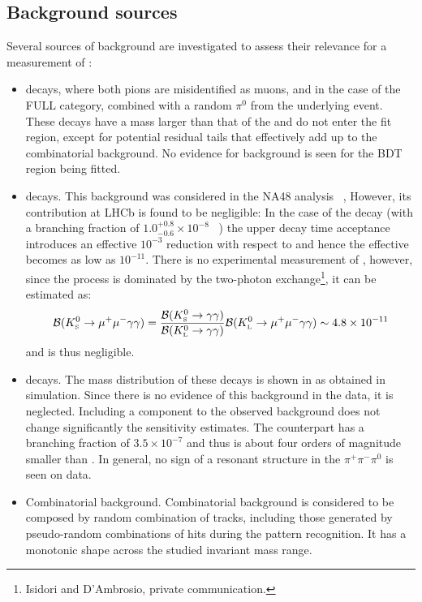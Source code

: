 
\subsection{Background sources}
\label{subsec:background}

Several sources of background are investigated to assess their relevance for a measurement of \BRof\Kspizmm:
\begin{itemize}
\item \Kspipi decays, where both pions are misidentified as muons, and in the case of the FULL category, combined with a random $\pi^0$ from the underlying event.
These decays have a mass larger than that of the \KS and do not enter the fit region, except for potential residual tails that effectively add up to the combinatorial background. %
No evidence for \Kspipi background is seen for the BDT region being fitted. 
\item \KTmTg decays. This background was considered in the NA48 analysis ~\cite{NA48}, 
However, its contribution at LHCb is found to be negligible: In the case of the \KL decay (with a branching fraction of $1.0^{+0.8}_{-0.6}\times10^{-8}$ ~\cite{PDG}) the upper decay time acceptance introduces 
an effective $10^{-3}$ reduction with respect to \KS and hence
the effective \BRof\KLTmTg becomes as low as $10^{-11}$. There is no experimental measurement of \BRof\KSTmTg, however, since
the process is dominated by the two-photon exchange\footnote{Isidori and D'Ambrosio, private communication.}, it can be estimated as:
\begin{equation}
{\cal B}(K^0_{\mathrm{\scriptscriptstyle S}}\to\mu^+\mu^-\gamma\gamma) = \frac{{\cal B}(K^0_{\mathrm{\scriptscriptstyle S}}\to\gamma\gamma)}{{\cal B}(K^0_{\mathrm{\scriptscriptstyle L}}\to\gamma\gamma)}{\cal B}(K^0_{\mathrm{\scriptscriptstyle L}}\to\mu^+\mu^-\gamma\gamma) \sim 4.8\times10^{-11}
\end{equation} 
\noindent and is thus negligible.
\item \KLTpi decays. The mass distribution of these decays is shown in  as obtained in simulation. Since there is no evidence of this background in the 
data, it is neglected. Including a \KLTpi component to the observed background does not change significantly the sensitivity estimates. The \KS counterpart has a branching fraction of $3.5\times10^{-7}$ and thus
is about four orders of magnitude smaller than \KLTpi. In general, no sign of a resonant structure in the $\pi^+\pi^-\pi^0$ is seen on data.

\item Combinatorial background. Combinatorial background is considered to be composed by random combination of tracks, including those generated by pseudo-random combinations of hits during the pattern recognition. 
It has a monotonic shape across the studied invariant mass range.

\end{itemize}

